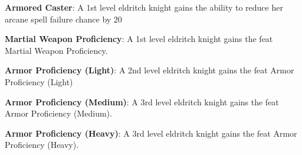 \textbf{Armored Caster}: A 1st level eldritch knight gains the ability to reduce her arcane spell failure chance by 20%

\textbf{Martial Weapon Proficiency}: A 1st level eldritch knight gains the feat Martial Weapon Proficiency.

\textbf{Armor Proficiency (Light)}: A 2nd level eldritch knight gains the feat Armor Proficiency (Light)

\textbf{Armor Proficiency (Medium)}: A 3rd level eldritch knight gains the feat Armor Proficiency (Medium).

\textbf{Armor Proficiency (Heavy)}: A 3rd level eldritch knight gains the feat Armor Proficiency (Heavy).